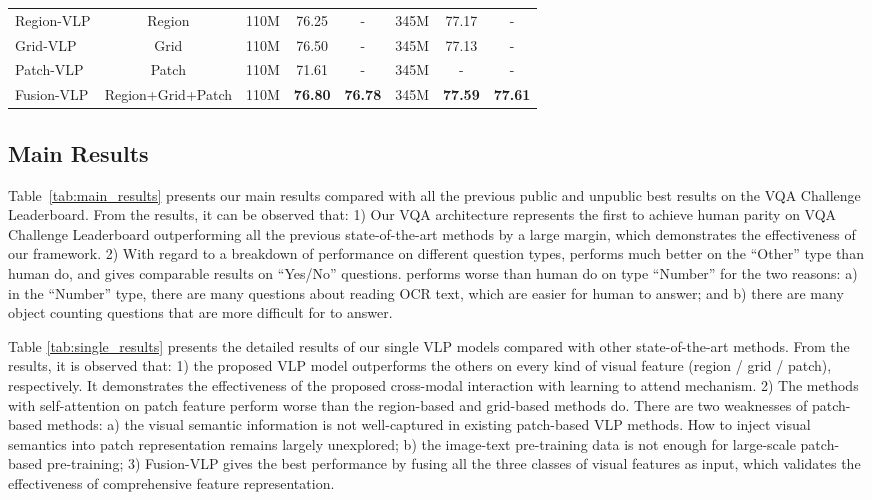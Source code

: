 \begin{table}[b]
\begin{tabular}{lc|ccc|ccc}
\midrule
Region-VLP                & Region                                            & 110M   &  76.25 &  -  & 345M &  77.17 &  - \\
Grid-VLP                  & Grid                                              & 110M   &  76.50 &  -  & 345M &  77.13 &  - \\
Patch-VLP                 & Patch                                             & 110M   &  71.61 &  -  & 345M &  - &  - \\
Fusion-VLP                                           & Region+Grid+Patch      & 110M   & \textbf{76.80}        & \textbf{76.78}        & 345M   & \textbf{77.59}   & \textbf{77.61}  \\ 
\bottomrule
\end{tabular}
\end{table}

\subsection{Main Results} \label{sec:mr}




Table~\ref{tab:main_results} presents our main results compared with all the previous public and unpublic best results on the VQA Challenge Leaderboard. From the results, it can be observed that: 1) Our VQA architecture \modelname represents the first to achieve human parity on VQA Challenge Leaderboard outperforming all the previous state-of-the-art methods by a large margin, which demonstrates the effectiveness of our framework. 2) With regard to a breakdown of performance on different question types, \modelname performs much better on the ``Other'' type than human do, and gives comparable results on ``Yes/No'' questions. \modelname performs worse than human do on type ``Number'' for the two reasons: a) in the ``Number'' type, there are many questions about reading OCR text, which are easier for human to answer; and b) there are many object counting questions that are more difficult for \modelname to answer.

Table \ref{tab:single_results} presents the detailed results of our single VLP models compared with other state-of-the-art methods. From the results, it is observed that: 1) the proposed VLP model outperforms the others on every kind of visual feature (region / grid / patch), respectively. It demonstrates the effectiveness of the proposed cross-modal interaction with learning to attend mechanism. 2) The methods with self-attention on patch feature perform worse than the region-based and grid-based methods do. There are two weaknesses of patch-based methods: a) the visual semantic information is not well-captured in existing patch-based VLP methods. How to inject visual semantics into patch representation remains largely unexplored; b) the image-text pre-training data is not enough for large-scale patch-based pre-training; 3) Fusion-VLP gives the best performance by fusing all the three classes of visual features as input, which validates the effectiveness of comprehensive feature representation.


